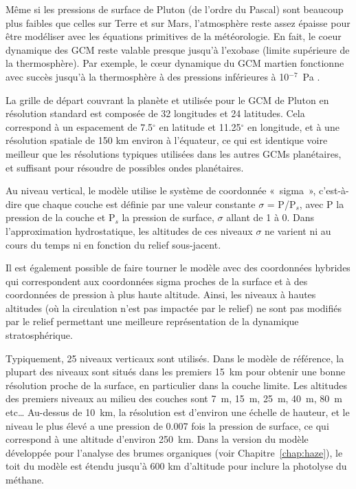 Même si les pressions de surface de Pluton (de l’ordre du Pascal) sont beaucoup plus faibles que celles sur Terre et sur Mars, l’atmosphère reste assez épaisse pour être modéliser avec les équations primitives de la météorologie. En fait, le coeur dynamique des GCM reste valable presque jusqu’à l’exobase (limite supérieure de la thermosphère). Par exemple, le cœur dynamique du GCM martien fonctionne avec succès jusqu’à la thermosphère à des pressions inférieures à 10$^{-7}$~Pa \citep{Gonz:09}.

La grille de départ couvrant la planète et utilisée pour le GCM de Pluton en résolution standard est composée de 32 longitudes et 24 latitudes. Cela correspond à un espacement de 7.5$^{\circ}$ en latitude et 11.25$^{\circ}$ en longitude, et à une résolution spatiale de 150 km environ à l’équateur, ce qui est identique voire meilleur que les résolutions typiques utilisées dans les autres GCMs planétaires, et suffisant pour résoudre de possibles ondes planétaires. 

Au niveau vertical, le modèle utilise le système de coordonnée «~sigma~», c’est-à-dire que chaque couche est définie par une valeur constante $\sigma$ = P/P$_{s}$, avec P la pression de la couche et P$_{s}$ la pression de surface, $\sigma$ allant de 1 à 0. Dans l’approximation hydrostatique, les altitudes de ces niveaux $\sigma$ ne varient ni au cours du temps ni en fonction du relief sous-jacent.

Il est également possible de faire tourner le modèle avec des coordonnées hybrides qui correspondent aux coordonnées sigma proches de la surface et à des coordonnées de pression à plus haute altitude. Ainsi, les niveaux à hautes altitudes (où la circulation n’est pas impactée par le relief) ne sont pas modifiés par le relief permettant une meilleure représentation de la dynamique stratosphérique. 

Typiquement, 25 niveaux verticaux sont utilisés. Dans le modèle de référence, la plupart des niveaux sont situés dans les premiers 15~km pour obtenir une bonne résolution proche de la surface, en particulier dans la couche limite. Les altitudes des premiers niveaux au milieu des couches sont 7~m, 15~m, 25~m, 40~m, 80~m etc… Au-dessus de 10~km, la résolution est d’environ une échelle de hauteur, et le niveau le plus élevé a une pression de 0.007 fois la pression de surface, ce qui correspond à une altitude d’environ 250~km. Dans la version du modèle développée pour l’analyse des brumes organiques (voir Chapitre~\ref{chap:haze}), le toit du modèle est étendu jusqu’à 600 km d’altitude pour inclure la photolyse du méthane. 

